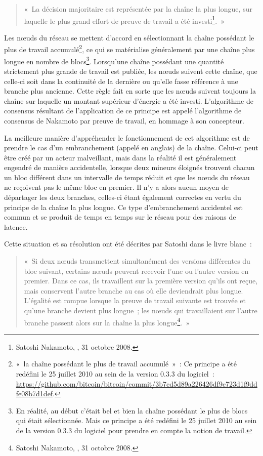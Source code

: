 \begin{quote}
«~La décision majoritaire est représentée par la chaîne la plus longue, sur laquelle le plus grand effort de preuve de travail a été investi\footnote{Satoshi Nakamoto, , 31 octobre 2008.}.~»
\end{quote}

Les nœuds du réseau se mettent d'accord en sélectionnant la chaîne possédant le plus de travail accumulé\footnote{«~la chaîne possédant le plus de travail accumulé~»~: Ce principe a été redéfini le 25 juillet 2010 au sein de la version 0.3.3 du logiciel~: \url{https://github.com/bitcoin/bitcoin/commit/3b7cd5d89a226426df9c723d1f9ddfe08b7d1def}.}, ce qui se matérialise généralement par une chaîne plus longue en nombre de blocs\footnote{En réalité, au début c'était bel et bien la chaîne possédant le plus de blocs qui était sélectionnée. Mais ce principe a été redéfini le 25 juillet 2010 au sein de la version 0.3.3 du logiciel pour prendre en compte la notion de travail.}. Lorsqu'une chaîne possédant une quantité strictement plus grande de travail est publiée, les nœuds suivent cette chaîne, que celle-ci soit dans la continuité de la dernière ou qu'elle fasse référence à une branche plus ancienne. Cette règle fait en sorte que les nœuds suivent toujours la chaîne sur laquelle un montant supérieur d'énergie a été investi. L'algorithme de consensus résultant de l'application de ce principe est appelé l'algorithme de consensus de Nakamoto par preuve de travail, en hommage à son concepteur.


La meilleure manière d'appréhender le fonctionnement de cet algorithme est de prendre le cas d'un embranchement (appelé  en anglais) de la chaîne. Celui-ci peut être créé par un acteur malveillant, mais dans la réalité il est généralement engendré de manière accidentelle, lorsque deux mineurs éloignés trouvent chacun un bloc différent dans un intervalle de temps réduit et que les nœuds du réseau ne reçoivent pas le même bloc en premier. Il n'y a alors aucun moyen de départager les deux branches, celles-ci étant également correctes en vertu du principe de la chaîne la plus longue. Ce type d'embranchement accidentel est commun et se produit de temps en temps sur le réseau pour des raisons de latence.

Cette situation et sa résolution ont été décrites par Satoshi dans le livre blanc~:

\begin{quote}
«~Si deux nœuds transmettent simultanément des versions différentes du bloc suivant, certains nœuds peuvent recevoir l'une ou l'autre version en premier. Dans ce cas, ils travaillent sur la première version qu'ils ont reçue, mais conservent l'autre branche au cas où elle deviendrait plus longue. L'égalité est rompue lorsque la preuve de travail suivante est trouvée et qu'une branche devient plus longue~; les nœuds qui travaillaient sur l'autre branche passent alors sur la chaîne la plus longue\footnote{Satoshi Nakamoto, , 31 octobre 2008.}.~»
\end{quote}

